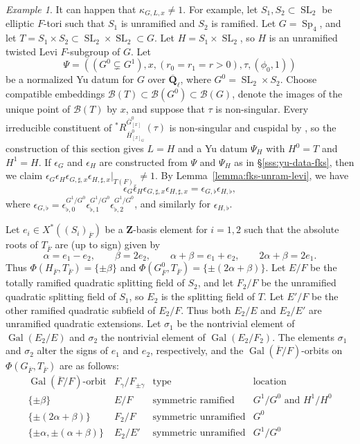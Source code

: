 \documentclass[reqno]{amsart}
\numberwithin{equation}{subsection}
\newcommand{\Q}{\mathbf{Q}}
\newcommand{\Z}{\mathbf{Z}}
\newcommand{\Gal}{\operatorname{Gal}}
\newcommand{\ol}[1]{\overline{#1}}
\newcommand\cB{\mathcal{B}}
\DeclareMathOperator{\SL}{SL}
\DeclareMathOperator{\Sp}{Sp}
\theoremstyle{remark}
\newtheorem{example}[thm]{Example}
\numberwithin{equation}{subsection}
\numberwithin{figure}{subsection}
\begin{document}
\begin{example}\label{example:nontrivial-sign-char}
It can happen that $\kappa_{G,L,x} \neq 1$. For example, let $S_1, S_2 \subset \SL_2$ be elliptic $F$-tori such that $S_1$ is unramified and $S_2$ is ramified. Let $G = \Sp_4$, and let $T = S_1 \times S_2 \subset \SL_2 \times \SL_2 \subset G$. Let $H = S_1 \times \SL_2$, so $H$ is an unramified twisted Levi $F$-subgroup of $G$. Let
\[
\Psi = ((G^0 \subsetneq G^1), x, (r_0=r_1=r>0), \tau, (\phi_0, 1))
\]
be a normalized Yu datum for $G$ over $\ol\Q_\ell$, where $G^0 = \SL_2 \times S_2$. Choose compatible embeddings $\cB(T)\subset\cB(G^0)\subset\cB(G)$, denote the images of the unique point of $\cB(T)$ by $x$, and suppose that $\tau$ is non-singular. Every irreducible constituent of ${}^*R^{\ol G^0_{[x]}}_{\ol H^0_{[x]_G}}(\tau)$ is non-singular and cuspidal by \cite[Lemma~2.9.4]{Cot26b}, so the construction of this section gives $L=H$ and a Yu datum $\Psi_H$ with $H^0=T$ and $H^1=H$. If $\epsilon_G$ and $\epsilon_H$ are constructed from $\Psi$ and $\Psi_H$ as in \S\ref{sss:yu-data-fks}, then we claim $\epsilon_G\epsilon_H\epsilon_{G,\sharp,x}\epsilon_{H,\sharp,x}|_{T(F)_x} \neq 1$. By Lemma~\ref{lemma:fks-unram-levi}, we have
\[
\epsilon_G\epsilon_H\epsilon_{G,\sharp,x}\epsilon_{H,\sharp,x} = \epsilon_{G,\flat}\epsilon_{H,\flat},
\]
where $\epsilon_{G,\flat} = \epsilon_{\flat,0}^{G^1/G^0}\epsilon_{\flat,1}^{G^1/G^0}\epsilon_{\flat,2}^{G^1/G^0}$, and similarly for $\epsilon_{H,\flat}$.

Let $e_i \in X^*((S_i)_{\ol F})$ be a $\Z$-basis element for $i = 1, 2$ such that the absolute roots of $T_{\ol F}$ are (up to sign) given by
\[
\alpha=e_1-e_2,\qquad \beta=2e_2,
\qquad \alpha+\beta=e_1+e_2,
\qquad 2\alpha+\beta=2e_1.
\]
Thus $\Phi(H_{\ol F},T_{\ol F})=\{\pm\beta\}$ and $\Phi(G^0_{\ol F},T_{\ol F})=\{\pm(2\alpha+\beta)\}$. Let $E/F$ be the totally ramified quadratic splitting field of $S_2$, and let $F_2/F$ be the unramified quadratic splitting field of $S_1$, so $E_2$ is the splitting field of $T$. Let $E'/F$ be the other ramified quadratic subfield of $E_2/F$. Thus both $E_2/E$ and $E_2/E'$ are unramified quadratic extensions. Let $\sigma_1$ be the nontrivial element of $\Gal(E_2/E)$ and $\sigma_2$ the nontrivial element of $\Gal(E_2/F_2)$. The elements $\sigma_1$ and $\sigma_2$ alter the signs of $e_1$ and $e_2$, respectively, and the $\Gal(\ol F/F)$-orbits on $\Phi(G_{\ol F},T_{\ol F})$ are as follows:
\begin{equation}\label{eq:sp4-root-orbit-table}
\begin{array}{c|c|c|c}
\Gal(\ol F/F)\text{-orbit} & F_\gamma/F_{\pm\gamma} & \text{type} & \text{location} \\ \hline
\{\pm\beta\} & E/F & \text{symmetric ramified} & G^1/G^0\text{ and }H^1/H^0 \\
\{\pm(2\alpha+\beta)\} & F_2/F & \text{symmetric unramified} & G^0 \\
\{\pm\alpha,\pm(\alpha+\beta)\} & E_2/E' & \text{symmetric unramified} & G^1/G^0
\end{array}
\end{equation}


\end{example}
\end{document}
